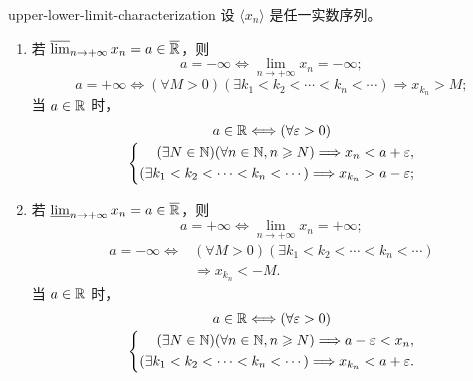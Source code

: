 \begin{mythm}{}{upper-lower-limit-characterization}
设 \(\langle x_n\rangle\) 是任一实数序列。
\begin{enumerate}[label=\arabic*)]
  \item 若 \(\varlimsup_{n\to+\infty}x_n=a\in\overline{\mathbb{R}}\)，则
  \[
  a=-\infty\Longleftrightarrow\lim_{n\to+\infty}x_n=-\infty;
  \]
  \[
  a=+\infty\Longleftrightarrow
  (\forall M>0)(\exists k_1<k_2<\cdots<k_n<\cdots)
  \Longrightarrow x_{k_n}>M;
  \]
  当 \(a\in\mathbb{R}\) 时，
  \[
  \begin{gathered}
  a\in\mathbb{R}\Longleftrightarrow(\forall\varepsilon>0)\\[-2pt]
  \left\{\begin{aligned}
  (\exists N\in\mathbb{N})(\forall n\in\mathbb{N}, n\geqslant N)
  \Longrightarrow x_n<a+\varepsilon,\\
  (\exists k_1<k_2<\cdots<k_n<\cdots)
  \Longrightarrow x_{k_n}>a-\varepsilon;
  \end{aligned}\right.
  \end{gathered}
  \]
  \item 若 \(\varliminf_{n\to+\infty}x_n=a\in\overline{\mathbb{R}}\)，则
  \[
  a=+\infty\Longleftrightarrow\lim_{n\to+\infty}x_n=+\infty;
  \]
  \[
  \begin{aligned}
  a=-\infty\Longleftrightarrow{}&
  (\forall M>0)(\exists k_1<k_2<\cdots<k_n<\cdots)\\[-2pt]
  &\Longrightarrow x_{k_n}<-M.
  \end{aligned}
  \]
  当 \(a\in\mathbb{R}\) 时，
  \[
  \begin{gathered}
  a\in\mathbb{R}\Longleftrightarrow(\forall\varepsilon>0)\\[-2pt]
  \left\{\begin{aligned}
  (\exists N\in\mathbb{N})(\forall n\in\mathbb{N}, n\geqslant N)
  \Longrightarrow a-\varepsilon<x_n,\\
  (\exists k_1<k_2<\cdots<k_n<\cdots)
  \Longrightarrow x_{k_n}<a+\varepsilon.
  \end{aligned}\right.
  \end{gathered}
  \]
\end{enumerate}
\end{mythm}

